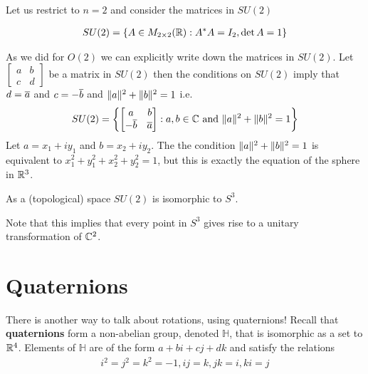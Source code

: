 Let us restrict to $n=2$ and consider the matrices in $SU(2)$

\begin{align}
	SU(2) = \{ A \in M_{2 \times 2}(\mathbb{R}) : A ^* A = I_2, \det A = 1\}
\end{align}

As we did for $O(2)$ we can explicitly write down the matrices in $SU(2)$. Let $\begin{bmatrix} a & b \\ c & d \end{bmatrix}$ be a matrix in $SU(2)$ then the conditions on $SU(2)$ imply that $d = \overline{a}$ and $c = -\overline{b}$ and $\lVert a \rVert^2 + \lVert b \rVert^2 = 1$ i.e.
\begin{align}
	SU(2) = \left\{ \begin{bmatrix} a & b \\ -\overline{b} & \overline{a} \end{bmatrix} : a, b \in \mathbb{C} \mbox{ and } \lVert a \rVert^2 + \lVert b \rVert^2 = 1 \right\}
\end{align}
Let $a = x_1 + i y_1$ and $b = x_2 + i y_2$. The the condition $\lVert a \rVert^2 + \lVert b \rVert^2 = 1$ is equivalent to $x_1^2 + y_1^2 + x_2^2 + y_2^2 = 1$, but this is exactly the equation of the sphere in $\mathbb{R}^3$.

\begin{thm}
	As a (topological) space $SU(2)$ is isomorphic to $S^3$.
\end{thm}
Note that this implies that every point in $S^3$ gives rise to a unitary transformation of $\mathbb{C}^2$.
\fi



\section{Quaternions}
There is another way to talk about rotations, using quaternions! Recall that \textbf{quaternions} form a non-abelian group, denoted $\mathbb{H}$, that is isomorphic as a set to $\mathbb{R}^4$. Elements of $\mathbb{H}$ are of the form $a + bi + cj + dk$ and satisfy the relations
\begin{align}
	i^2 = j^2 = k^2 = -1, ij = k, jk = i, ki = j
\end{align}

\iffalse

Similar to complex numbers we have conjugation and norm on quaternions given by
\begin{align}
	\norm{a + bi + cj + dk}^2 & = a^2 + b^2 + c^2 + d^2 \\
	\conj{a + bi + cj + dk}   & = a - bi - cj - dk
\end{align}
and we also have the identity
\begin{align}
	(a + bi + cj + dk).\conj{(a + bi + cj + dk)} = \norm{a + bi + cj + dk}^2
\end{align}
In particular note that if $p$ has norm 1 then $p^-1 = \conj p$.
\fi

